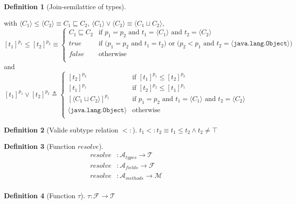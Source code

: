 \documentclass[english,dvips,ps2pdf,11pt]{article}
\theoremstyle{definition}
\newtheorem{definition}{Definition}[section]
\newcommand{\var}[1]{\ensuremath{\mathit{#1}}\xspace}
\newcommand{\refarray}[2]{\ensuremath{[#2]^{#1}}\xspace}
\newcommand{\refobject}[1]{\ensuremath{\langle #1 \rangle}\xspace}
\newcommand{\concretetypes}[0]{\ensuremath{\mathcal{T}}\xspace}
\newcommand{\fields}[0]{\ensuremath{\mathcal{F}}\xspace}
\newcommand{\methods}[0]{\ensuremath{\mathcal{M}}\xspace}
\newcommand{\pfields}[0]{\ensuremath{\mathcal{A}_\var{fields}}\xspace}
\newcommand{\ptypes}[0]{\ensuremath{\mathcal{A}_\var{types}}\xspace}
\newcommand{\pmethods}[0]{\ensuremath{\mathcal{A}_\var{methods}}\xspace}
\newcommand{\jobject}[0]{\ensuremath{\texttt{java.lang.Object}}\xspace}
\newcommand{\resolve}[0]{\var{resolve}}
\newcommand{\typeof}[0]{\ensuremath{\tau}\xspace}
\newcommand{\cinherits}[0]{\ensuremath{\sqsubseteq}\xspace}
\newcommand{\cjoin}[0]{\ensuremath{\sqcup}\xspace}
\newcommand{\subtype}[0]{\ensuremath{<:}\xspace}
\begin{document}
\begin{definition}[Join-semilattice of types]
\begin{center}
  \end{center}
  with
  $\refobject{C_1} \leq \refobject{C_2} \equiv C_1 \cinherits C_2$,
  $\refobject{C_1} \vee \refobject{C_2} \equiv \refobject{C_1 \cjoin C_2}$,
  \[
  \refarray{p_1}{t_1} \leq \refarray{p_2}{t_2} \equiv \begin{cases}
    C_1 \cinherits C_2 & \text{if $p_1 = p_2$ and $t_1 = \refobject{C_1}$ and $t_2 = \refobject{C_2}$}\\
    \var{true} & \text{if ($p_1 = p_2$ and $t_1 = t_2$) or ($p_2 < p_1$ and $t_2 = \refobject{\jobject}$)}\\
    \var{false} & \text{otherwise}\\
    \end{cases}
  \]
  and
  \[
  \refarray{p_1}{t_1} \vee \refarray{p_2}{t_2} \triangleq \begin{cases}
    \refarray{p_2}{t_2} & \text{if $\refarray{p_1}{t_1} \leq \refarray{p_2}{t_2}$}\\ 
    \refarray{p_1}{t_1} & \text{if $\refarray{p_2}{t_2} \leq \refarray{p_1}{t_1}$}\\
    \refarray{p_1}{\refobject{C_1 \cjoin C_2}} & \text{if $p_1 = p_2$ and $t_1 = \refobject{C_1}$ and $t_2 = \refobject{C_2}$}\\
    \refobject{\jobject} & \text{otherwise}\\
  \end{cases}
  \]
\end{definition}


\begin{definition}[Valide subtype relation \subtype]
  $t_1 \subtype t_2 \equiv t_1 \leq t_2 \wedge t_2 \neq \top$
\end{definition}



\begin{definition}[Function \resolve]
  \begin{align*}
    \resolve & : \ptypes \longrightarrow \concretetypes\\
    \resolve & : \pfields \longrightarrow \fields\\
    \resolve & : \pmethods \longrightarrow \methods\\
  \end{align*}
\end{definition}

\begin{definition}[Function \typeof]
  $\typeof : \fields \longrightarrow \concretetypes$
\end{definition}
\end{document}
